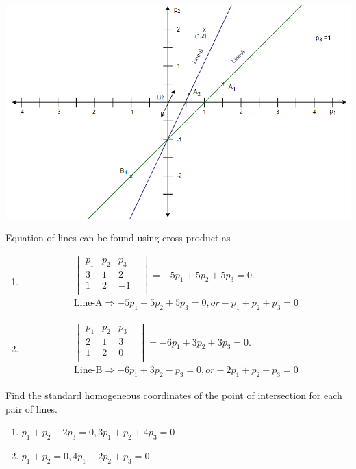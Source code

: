 \documentclass[11pt]{article}
\begin{document}
\begin{enumerate}
\begin{tcolorbox}
\begin{center}
\includegraphics[width=\linewidth]{images/Q7.PNG}
\label{fig:q7}
\end{center}

Equation of lines can be found using cross product as
\begin{enumerate}[]
\item
\begin{gather*}
    \begin{vmatrix}
        p_1 & p_2 & p_3 & \\ 
        3 & 1 & 2\\
        1 & 2 & -1\\
    \end{vmatrix} = -5p_1+5p_2+5p_3 = 0.
    \\
    \text{Line-A} \Rightarrow -5p_1+5p_2+5p_3 = 0, or -p_1+p_2+p_3 = 0 
\end{gather*}

\item
\begin{gather*}
    \begin{vmatrix}
        p_1 & p_2 & p_3 & \\ 
        2 & 1 & 3\\
        1 & 2 & 0\\
    \end{vmatrix} = -6p_1+3p_2+3p_3 = 0.
    \\
    \text{Line-B} \Rightarrow -6p_1+3p_2-p_3 = 0, or -2p_1+p_2+p_3 = 0 
\end{gather*}
\end{enumerate}

\end{tcolorbox} \begin{tcolorbox}
\item  Find the standard homogeneous coordinates of the point of
  intersection for each pair of lines. 
\begin{multicols}{2}
\begin{enumerate}[]
\item
$p_1 + p_2 - 2p_3 = 0, 3p_1 + p_2 + 4p_3 = 0$
\item
$p_1 + p_2 = 0, 4p_1 - 2p_2 + p_3 = 0$
\end{enumerate}
\end{multicols}


\end{tcolorbox}
\end{enumerate}
\end{document}
